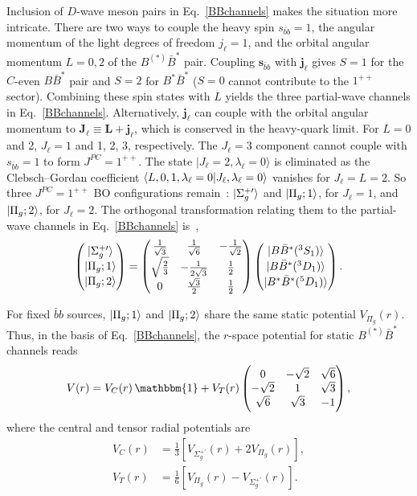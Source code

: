 \documentclass[aps,prl,showpacs,amsmath,twocolumn,superscriptaddress,floatfix,nofootinbib,notitlepage]{revtex4-2}
\newcommand{\be}{\begin{equation}}
\newcommand{\ee}{\end{equation}}
\begin{document}
Inclusion of $D$-wave meson pairs in Eq.~\eqref{BBchannels} makes the situation more intricate. There are two ways to couple the heavy spin $s_{\bar{b}b}=1$, the angular momentum of the light degrees of freedom ${j}_\ell=1$, and the orbital angular momentum $L=0,2$ of the $B^{(*)}\bar{B}^*$ pair. Coupling $\bm{s}_{\bar{b}b}$ with $\bm{j}_\ell$ gives $S=1$ for the $C$-even $B\bar{B}^*$ pair and $S=2$ for $B^*\bar{B}^*$ ($S=0$ cannot contribute to the $1^{++}$ sector). Combining these spin states with $L$ yields the three partial-wave channels in Eq.~\eqref{BBchannels}. Alternatively, $\bm{j}_\ell$ can couple with the orbital angular momentum to $\bm{J}_\ell\equiv\bm{L}+\bm{j}_\ell$, which is conserved in the heavy-quark limit. For $L=0$ and 2, $J_\ell =1$ and 1, 2, 3, respectively. The $J_\ell=3$ component cannot couple with $s_{\bar{b}b} = 1$ to form $J^{PC}=1^{++}$. The state $|J_\ell=2,\lambda_\ell=0\rangle$ is eliminated
as the Clebsch--Gordan coefficient $\braket{L,0,1,\lambda_\ell=0|J_\ell,\lambda_\ell=0}$ vanishes for $J_\ell=L=2$. So three $J^{PC}=1^{++}$ BO configurations remain~\cite{Brambilla:2026zfw}: $\ket{\Sigma_g^{+\prime}}$ and $\ket{\Pi_g;1}$, for $J_\ell=1$,  and $\ket{\Pi_g;2}$, for $J_\ell=2$. The orthogonal transformation relating them to the partial-wave channels in Eq.~\eqref{BBchannels} is~\cite{Zhang:2026iyr},
$$
\begin{pmatrix}\ket{\Sigma_g^{+\prime}}\\[0.5mm] \ket{\Pi_g;1}\\[0.5mm] \ket{\Pi_g;2}\end{pmatrix}
=\begin{pmatrix}
\frac{1}{\sqrt3} & \frac{1}{\sqrt6} & -\frac{1}{\sqrt2}\\[1mm]
\sqrt{\frac23} & -\frac{1}{2\sqrt3} & \frac12\\[1mm]
0 & \frac{\sqrt3}{2} & \frac12
\end{pmatrix}
\begin{pmatrix}\ket{B\bar{B}^*(^3S_1)}\\[0.5mm] \ket{B\bar{B}^*(^3D_1)}\\[0.5mm] \ket{B^*\bar{B}^*(^5D_1)}\end{pmatrix}.
$$

For fixed $\bar{b}b$ sources, $\ket{\Pi_g;1}$ and $\ket{\Pi_g;2}$ share the same static potential $V_{\Pi_g}(r)$. Thus, in the basis of Eq.~\eqref{BBchannels}, the $r$-space potential for static $B^{(*)}\bar{B}^*$ channels reads
\be
V(r)
=
V_C(r)\,\mathbbm{1}
+
V_T(r)
\begin{pmatrix}
0 & -\sqrt2 & \sqrt6\\
-\sqrt2 & 1 & \sqrt3\\
\sqrt6 & \sqrt3 & -1
\end{pmatrix},
\label{eq:cylindricalstuff}
\ee
where the central and tensor radial potentials are
\be
\begin{split}
V_C(r) &= \frac13 \left[V_{\Sigma_g^{+\prime}}(r)+2V_{\Pi_g}(r)\right], \\
V_T(r) &= \frac16\left[V_{\Pi_g}(r) - V_{\Sigma_g^{+\prime}}(r) \right].
\end{split}
\label{eq:VCT-BO}
\ee
\end{document}
